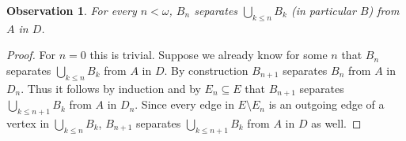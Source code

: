 \documentclass[12pt,a4paper]{amsart}
\theoremstyle{plain}
\newtheorem{observation}[theorem]{Observation}
\theoremstyle{definition}
\begin{document}
\begin{observation}\label{obs: separates n}
For every $ n<\omega $, $ B_n $ separates $ \bigcup_{k\leq n}B_k $ (in particular $ B $) from $ A $ in $ D $.
\end{observation}
\begin{proof}
For $ n=0 $ this is trivial. Suppose we already know for some $ n $ that $ B_n $ separates 
$ \bigcup_{k\leq n}B_k $ from $ A $ in $ D $. By construction $ B_{n+1} $ separates $ B_n $ from $ A $ in $ D_n 
$. Thus it follows by induction and by $ E_n\subseteq E $ that  $ B_{n+1} $ separates $ \bigcup_{k\leq n+1}B_k $ from $ A 
$ in $ D_n 
$. Since
every edge in $ E\setminus E_n $ is an outgoing edge of a vertex in $ \bigcup_{k\leq n}B_k $,  $ B_{n+1} $ separates $ \bigcup_{k\leq n+1}B_k 
$ from $ A $ in $ D 
$ as well.
\end{proof}
\end{document}
